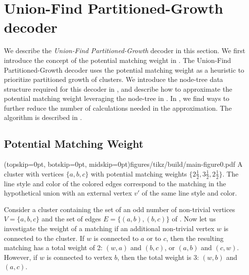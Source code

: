 \section{Union-Find Partitioned-Growth decoder}\label{sec:ufbb}
We describe the \emph{Union-Find Partitioned-Growth} decoder in this section. We first introduce the concept of the potential matching weight in . The Union-Find Partitioned-Growth decoder uses the potential matching weight as a heuristic to prioritize partitioned growth of clusters. We introduce the node-tree data structure required for this decoder in , and describe how to approximate the potential matching weight leveraging the node-tree in . In , we find ways to further reduce the number of calculations needed in the approximation. The algorithm is described in . 

\subsection{Potential Matching Weight}\label{sec:matchingweight}

\Figure[bt](topskip=0pt, botskip=0pt, midskip=0pt){figures/tikz/build/main-figure0.pdf}{
    A cluster with vertices $\{a,b,c\}$ with potential matching weights $\{2\frac{1}{2}, 3\frac{1}{2}, 2\frac{1}{2}\}$. The line style and color of the colored edges correspond to the matching in the hypothetical union with an external vertex $v'$ of the same line style and color.\label{fig0}}


Consider a cluster containing the set of an odd number of non-trivial vertices $V=\{a,b,c\}$ and the set of edges $E=\{(a,b), (b, c)\}$ of . Now let us investigate the weight of a matching if an additional non-trivial vertex $w$ is connected to the cluster. If $w$ is connected to $a$ or to $c$, then the resulting matching has a total weight of 2: $(w,a)$ and $(b,c)$, or $(a,b)$ and $(c,w)$. However, if $w$ is connected to vertex $b$, then the total weight is 3: $(w, b)$ and $(a, c)$. %

